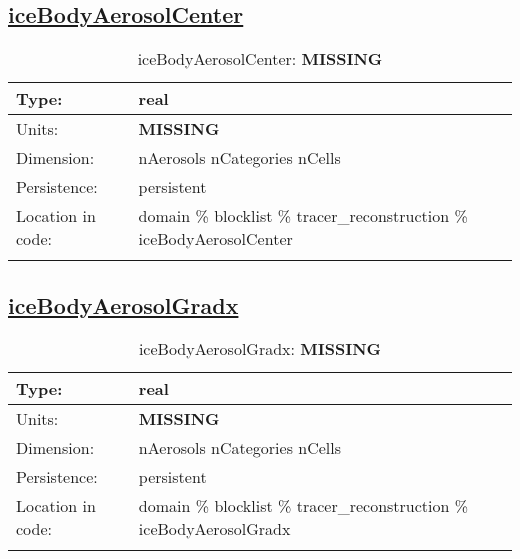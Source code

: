 \subsection[iceBodyAerosolCenter]{\hyperref[sec:var_tab_tracer_reconstruction]{iceBodyAerosolCenter}}
\label{subsec:var_sec_tracer_reconstruction_iceBodyAerosolCenter}
\begin{center}
\begin{longtable}{| p{2.0in} | p{4.0in} |}
        \hline 
        Type: & real \\
        \hline 
        Units: & {\bf \color{red} MISSING} \\
        \hline 
        Dimension: & nAerosols nCategories nCells \\
        \hline 
        Persistence: & persistent \\
        \hline 
         Location in code: & domain \% blocklist \% tracer\_reconstruction \% iceBodyAerosolCenter \\
         \hline 
    \caption{iceBodyAerosolCenter: {\bf \color{red} MISSING}}
\end{longtable}
\end{center}
\subsection[iceBodyAerosolGradx]{\hyperref[sec:var_tab_tracer_reconstruction]{iceBodyAerosolGradx}}
\label{subsec:var_sec_tracer_reconstruction_iceBodyAerosolGradx}
\begin{center}
\begin{longtable}{| p{2.0in} | p{4.0in} |}
        \hline 
        Type: & real \\
        \hline 
        Units: & {\bf \color{red} MISSING} \\
        \hline 
        Dimension: & nAerosols nCategories nCells \\
        \hline 
        Persistence: & persistent \\
        \hline 
         Location in code: & domain \% blocklist \% tracer\_reconstruction \% iceBodyAerosolGradx \\
         \hline 
    \caption{iceBodyAerosolGradx: {\bf \color{red} MISSING}}
\end{longtable}
\end{center}
